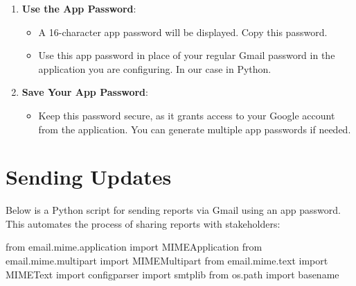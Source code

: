 \documentclass[
  letterpaper,
  DIV=11,
  numbers=noendperiod]{scrreprt}
\newenvironment{Shaded}{\begin{snugshade}}{\end{snugshade}}
\newcommand{\ImportTok}[1]{\textcolor[rgb]{0.00,0.46,0.62}{#1}}
\newcommand{\NormalTok}[1]{\textcolor[rgb]{0.00,0.23,0.31}{#1}}
\providecommand{\tightlist}{%
  \setlength{\itemsep}{0pt}\setlength{\parskip}{0pt}}\usepackage{longtable,booktabs,array}
\begin{document}
\begin{enumerate}
\begin{itemize}
\begin{figure}[H]
    \end{figure}%
  \end{itemize}
\item
  \textbf{Use the App Password}:

  \begin{itemize}
  \item
    A 16-character app password will be displayed. Copy this password.
  \item
    Use this app password in place of your regular Gmail password in the
    application you are configuring. In our case in Python.
  \end{itemize}
\item
  \textbf{Save Your App Password}:

  \begin{itemize}
  \tightlist
  \item
    Keep this password secure, as it grants access to your Google
    account from the application. You can generate multiple app
    passwords if needed.
  \end{itemize}
\end{enumerate}

\section{Sending Updates}\label{sending-updates}

Below is a Python script for sending reports via Gmail using an app
password. This automates the process of sharing reports with
stakeholders:

\begin{Shaded}
\begin{Highlighting}[]
\ImportTok{from}\NormalTok{ email.mime.application }\ImportTok{import}\NormalTok{ MIMEApplication}
\ImportTok{from}\NormalTok{ email.mime.multipart }\ImportTok{import}\NormalTok{ MIMEMultipart}
\ImportTok{from}\NormalTok{ email.mime.text }\ImportTok{import}\NormalTok{ MIMEText}
\ImportTok{import}\NormalTok{ configparser}
\ImportTok{import}\NormalTok{ smtplib}
\ImportTok{from}\NormalTok{ os.path }\ImportTok{import}\NormalTok{ basename}
\end{Highlighting}
\end{Shaded}
\end{document}
